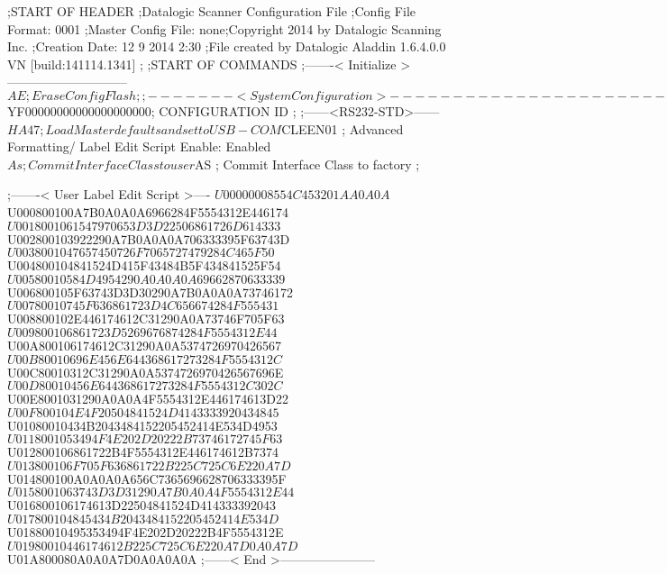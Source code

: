 ;START OF HEADER
;Datalogic Scanner Configuration File
;Config File Format: 0001
;Master Config File: none;Copyright 2014 by Datalogic Scanning Inc.
;Creation Date: 12 9 2014 2:30
;File created by Datalogic Aladdin 1.6.4.0.0 VN [build:141114.1341]
;
;START OF COMMANDS
;-------< Initialize >-----------------------------
$AE                 ; Erase Config Flash
;
;-------< System Configuration >-------------------------------
$YF00000000000000000000; CONFIGURATION ID
;
;------<RS232-STD>------
$HA47               ; Load Master defaults and set to USB-COM
$CLEEN01            ; Advanced Formatting/ Label Edit Script Enable: Enabled
$As                 ; Commit Interface Class to user
$AS                 ; Commit Interface Class to factory
;

;-------< User Label Edit Script >----
$U00000008554C453201AA0A0A
$U000800100A7B0A0A0A6966284F5554312E446174
$U0018001061547970653D3D22506861726D614333
$U002800103922290A7B0A0A0A706333395F63743D
$U0038001047657450726F7065727479284C465F50
$U004800104841524D415F43484B5F434841525F54
$U00580010584D4954290A0A0A0A69662870633339
$U006800105F63743D3D30290A7B0A0A0A73746172
$U00780010745F636861723D4C656674284F555431
$U008800102E446174612C31290A0A73746F705F63
$U009800106861723D5269676874284F5554312E44
$U00A800106174612C31290A0A5374726970426567
$U00B80010696E456E644368617273284F5554312C
$U00C80010312C31290A0A5374726970426567696E
$U00D80010456E644368617273284F5554312C302C
$U00E8001031290A0A0A4F5554312E446174613D22
$U00F800104E4F20504841524D4143333920434845
$U01080010434B2043484152205452414E534D4953
$U0118001053494F4E202D20222B73746172745F63
$U012800106861722B4F5554312E446174612B7374
$U013800106F705F636861722B225C725C6E220A7D
$U014800100A0A0A0A656C7365696628706333395F
$U0158001063743D3D31290A7B0A0A4F5554312E44
$U016800106174613D22504841524D414333392043
$U017800104845434B2043484152205452414E534D
$U01880010495353494F4E202D20222B4F5554312E
$U01980010446174612B225C725C6E220A7D0A0A7D
$U01A800080A0A0A7D0A0A0A0A
;------< End >-----------------------
